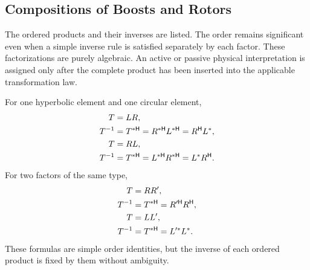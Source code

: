 \subsection{Compositions of Boosts and Rotors}
The ordered products and their inverses are listed. The order remains significant even when a simple inverse rule is satisfied separately by each factor.
These factorizations are purely algebraic. An active or passive physical
interpretation is assigned only after the complete product has been inserted
into the applicable transformation law.

For one hyperbolic element and one circular element,
\begin{align*}
T &= L R, \\
T^{-1} &= T^{*\mathsf H} = R^{*\mathsf H} L^{*\mathsf H} = R^{\mathsf H} L^{*}, \\
T &= R L, \\
T^{-1} &= T^{*\mathsf H} = L^{*\mathsf H} R^{*\mathsf H} = L^{*} R^{\mathsf H}.
\end{align*}
For two factors of the same type,
\begin{align*}
T &= RR', \\
T^{-1} &= T^{*\mathsf H}
=R'^{\mathsf H}R^{\mathsf H}, \\
T &= LL', \\
T^{-1} &= T^{*\mathsf H}
=L'^{*}L^{*}.
\end{align*}
These formulas are simple order identities, but the inverse of each ordered product is fixed by them without ambiguity.
